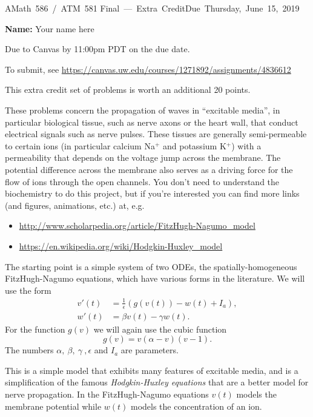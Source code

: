 \documentclass[10pt]{article}
\begin{document}
\hfill\vbox{\hbox{AMath 586 / ATM 581}
\hbox{Final --- Extra Credit}\hbox{Due Thursday, June 15, 2019}}

{\bf Name:} Your name here
\vskip 5pt

Due to Canvas by 11:00pm PDT on the due date.

To submit, see \url{https://canvas.uw.edu/courses/1271892/assignments/4836612}

This extra credit set of problems is worth an additional 20 points.


These problems concern the propagation of waves in ``excitable media'', in
particular biological tissue, such as nerve axons or the heart wall, that
conduct electrical signals such as nerve pulses.  These tissues are
generally semi-permeable to certain ions (in particular calcium Na$^+$ and
potassium K$^+$) with a permeability that depends on the voltage jump across
the membrane.  The potential difference across the membrane also serves as a
driving force for the flow of ions through the open channels.  You don't
need to understand the biochemistry to do this project, but if you're interested
you can find more links (and figures, animations, etc.) at, e.g.
\begin{itemize}
\item \url{http://www.scholarpedia.org/article/FitzHugh-Nagumo_model}
\item \url{https://en.wikipedia.org/wiki/Hodgkin-Huxley_model}
\end{itemize}

The starting point is a simple system of two ODEs, the spatially-homogeneous
FitzHugh-Nagumo
equations, which have various forms in the literature.  We will use the form
\begin{equation}\label{FHNode}
\begin{split}
v'(t) &= \frac 1 \epsilon (g(v(t)) - w(t) + I_a),\\
w'(t) &= \beta v(t) - \gamma w(t).
\end{split}
\end{equation} 
For the function $g(v)$ we will again use the cubic function
\begin{equation}\label{fv}
g(v) = v(\alpha - v)(v-1).
\end{equation} 
The  numbers $\alpha,~\beta,~\gamma~,\epsilon$ and $I_a$ are parameters.

This is a simple model that exhibits many features of excitable media, and
is a simplification of the famous {\it Hodgkin-Huxley equations} that are a 
better model for nerve propagation.  In the FitzHugh-Nagumo equations 
$v(t)$ models the membrane potential while $w(t)$ models the concentration
of an ion.
\end{document}
